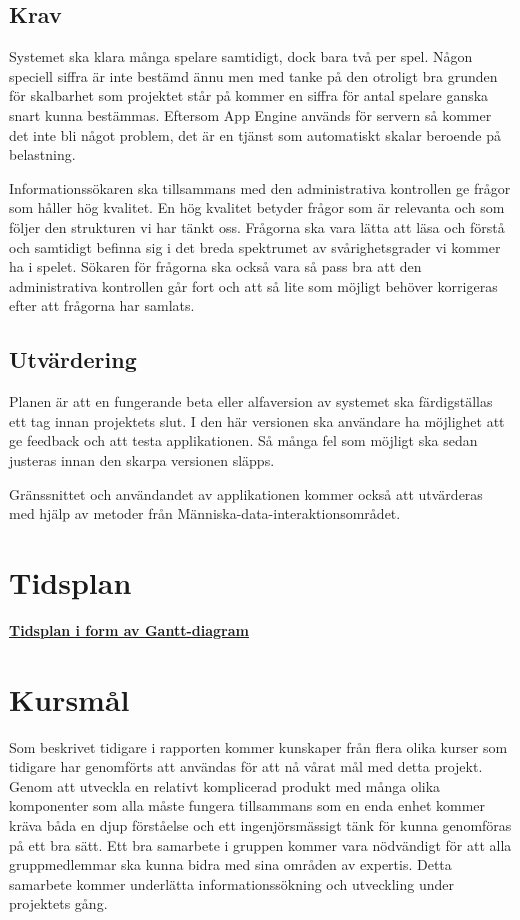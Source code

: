 \documentclass[swedish,12pt,a4paper]{article}
\begin{document}
\subsection{Krav}
Systemet ska klara många spelare samtidigt, dock bara två per spel. Någon speciell siffra är inte bestämd ännu men med tanke på den otroligt bra grunden för skalbarhet som projektet står på kommer en siffra för antal spelare ganska snart kunna bestämmas. Eftersom App Engine används för servern så kommer det inte bli något problem, det är en tjänst som automatiskt skalar beroende på belastning.

Informationssökaren ska tillsammans med den administrativa kontrollen ge frågor som håller hög kvalitet. En hög kvalitet betyder frågor som är relevanta och som följer den strukturen vi har tänkt oss. Frågorna ska vara lätta att läsa och förstå och samtidigt befinna sig i det breda spektrumet av svårighetsgrader vi kommer ha i spelet. Sökaren för frågorna ska också vara så pass bra att den administrativa kontrollen går fort och att så lite som möjligt behöver korrigeras efter att frågorna har samlats.

\subsection{Utvärdering}
Planen är att en fungerande beta eller alfaversion av systemet ska färdigställas ett tag innan projektets slut. I den här versionen ska användare ha möjlighet att ge feedback och att testa applikationen. Så många fel som möjligt ska sedan justeras innan den skarpa versionen släpps.

Gränssnittet och användandet av applikationen kommer också att utvärderas med hjälp av metoder från Människa-data-interaktionsområdet.
\appendix

\section{Tidsplan}

\textbf{\href{http://www.gantt-chart.com//?td=550c7506aa5a1dd480bd4c8d-845131}{Tidsplan i form av Gantt-diagram}}\\

\section{Kursmål}

Som beskrivet tidigare i rapporten kommer kunskaper från flera olika kurser som tidigare har genomförts att användas för att nå vårat mål med detta projekt. Genom att utveckla en relativt komplicerad produkt med många olika komponenter som alla måste fungera tillsammans som en enda enhet kommer kräva båda en djup förståelse och ett ingenjörsmässigt tänk för kunna genomföras på ett bra sätt.
Ett bra samarbete i gruppen kommer vara nödvändigt för att alla gruppmedlemmar ska kunna bidra med sina områden av expertis. Detta samarbete kommer underlätta informationssökning och utveckling under projektets gång.\\

\newpage
\printbibliography[title={Referenser}]
\end{document}
